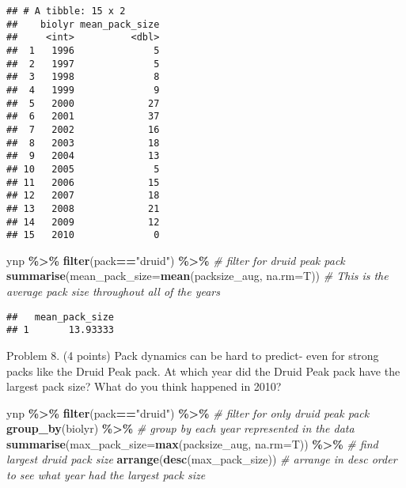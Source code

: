 \documentclass[
]{article}
\newenvironment{Shaded}{\begin{snugshade}}{\end{snugshade}}
\newcommand{\AttributeTok}[1]{\textcolor[rgb]{0.13,0.29,0.53}{#1}}
\newcommand{\CommentTok}[1]{\textcolor[rgb]{0.56,0.35,0.01}{\textit{#1}}}
\newcommand{\FunctionTok}[1]{\textcolor[rgb]{0.13,0.29,0.53}{\textbf{#1}}}
\newcommand{\NormalTok}[1]{#1}
\newcommand{\SpecialCharTok}[1]{\textcolor[rgb]{0.81,0.36,0.00}{\textbf{#1}}}
\newcommand{\StringTok}[1]{\textcolor[rgb]{0.31,0.60,0.02}{#1}}
\begin{document}
\begin{verbatim}
## # A tibble: 15 x 2
##    biolyr mean_pack_size
##     <int>          <dbl>
##  1   1996              5
##  2   1997              5
##  3   1998              8
##  4   1999              9
##  5   2000             27
##  6   2001             37
##  7   2002             16
##  8   2003             18
##  9   2004             13
## 10   2005              5
## 11   2006             15
## 12   2007             18
## 13   2008             21
## 14   2009             12
## 15   2010              0
\end{verbatim}

\begin{Shaded}
\begin{Highlighting}[]
\NormalTok{ynp }\SpecialCharTok{\%\textgreater{}\%}
  \FunctionTok{filter}\NormalTok{(pack}\SpecialCharTok{==}\StringTok{"druid"}\NormalTok{) }\SpecialCharTok{\%\textgreater{}\%} \CommentTok{\# filter for druid peak pack}
  \FunctionTok{summarise}\NormalTok{(}\AttributeTok{mean\_pack\_size=}\FunctionTok{mean}\NormalTok{(packsize\_aug, }\AttributeTok{na.rm=}\NormalTok{T)) }\CommentTok{\# This is the average pack size throughout all of the years}
\end{Highlighting}
\end{Shaded}

\begin{verbatim}
##   mean_pack_size
## 1       13.93333
\end{verbatim}

Problem 8. (4 points) Pack dynamics can be hard to predict- even for
strong packs like the Druid Peak pack. At which year did the Druid Peak
pack have the largest pack size? What do you think happened in 2010?

\begin{Shaded}
\begin{Highlighting}[]
\NormalTok{ynp }\SpecialCharTok{\%\textgreater{}\%}
  \FunctionTok{filter}\NormalTok{(pack}\SpecialCharTok{==}\StringTok{"druid"}\NormalTok{) }\SpecialCharTok{\%\textgreater{}\%} \CommentTok{\# filter for only druid peak pack}
  \FunctionTok{group\_by}\NormalTok{(biolyr) }\SpecialCharTok{\%\textgreater{}\%} \CommentTok{\# group by each year represented in the data}
  \FunctionTok{summarise}\NormalTok{(}\AttributeTok{max\_pack\_size=}\FunctionTok{max}\NormalTok{(packsize\_aug, }\AttributeTok{na.rm=}\NormalTok{T)) }\SpecialCharTok{\%\textgreater{}\%} \CommentTok{\# find largest druid pack size}
  \FunctionTok{arrange}\NormalTok{(}\FunctionTok{desc}\NormalTok{(max\_pack\_size)) }\CommentTok{\# arrange in desc order to see what year had the largest pack size}
\end{Highlighting}
\end{Shaded}
\end{document}
